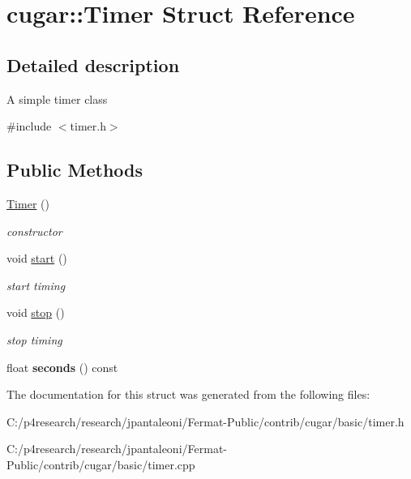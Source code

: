 \hypertarget{structcugar_1_1_timer}{}\section{cugar\+:\+:Timer Struct Reference}
\label{structcugar_1_1_timer}


\subsection{Detailed description}
A simple timer class 

{\ttfamily \#include $<$timer.\+h$>$}

\subsection*{Public Methods}
\begin{DoxyCompactItemize}
\item 
\mbox{\label{structcugar_1_1_timer_a79074c97cbaa5973d0045298dd2c0632}} 
\hyperlink{structcugar_1_1_timer_a79074c97cbaa5973d0045298dd2c0632}{Timer} ()
\begin{DoxyCompactList}\small\item\em constructor \end{DoxyCompactList}\item 
\mbox{\label{structcugar_1_1_timer_a337264814110dc99fd8b78b1267589d7}} 
void \hyperlink{structcugar_1_1_timer_a337264814110dc99fd8b78b1267589d7}{start} ()
\begin{DoxyCompactList}\small\item\em start timing \end{DoxyCompactList}\item 
\mbox{\label{structcugar_1_1_timer_a5422f0db9e2758449a30ba41a4480f6d}} 
void \hyperlink{structcugar_1_1_timer_a5422f0db9e2758449a30ba41a4480f6d}{stop} ()
\begin{DoxyCompactList}\small\item\em stop timing \end{DoxyCompactList}\item 
\mbox{\label{structcugar_1_1_timer_a821c1d9db73f3b81262b42b2c4a751db}} 
float {\bfseries seconds} () const
\end{DoxyCompactItemize}


The documentation for this struct was generated from the following files\+:\begin{DoxyCompactItemize}
\item 
C\+:/p4research/research/jpantaleoni/\+Fermat-\/\+Public/contrib/cugar/basic/timer.\+h\item 
C\+:/p4research/research/jpantaleoni/\+Fermat-\/\+Public/contrib/cugar/basic/timer.\+cpp\end{DoxyCompactItemize}
